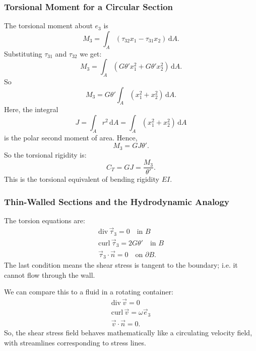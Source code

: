 \subsubsection{Torsional Moment for a Circular Section}
The torsional moment about $e_3$ is
\begin{equation*}
  M_3 = \int_A \left( \tau_{32}x_1 - \tau_{31}x_2 \right) \, \mathrm{d}A
.\end{equation*}
Substituting $\tau_{31}$ and $\tau_{32}$ we get:
\begin{equation*}
  M_3 = \int_A \left( G \theta' x_1^2 + G \theta' x_2^2\right) \, \mathrm{d}A
.\end{equation*}
So
\begin{equation*}
  M_3 = G \theta' \int_A \left( x_1^2 + x_2^2 \right)\, \mathrm{d}A
.\end{equation*}
Here, the integral
\begin{equation*}
  J = \int_A r^2 \, \mathrm{d}A = \int_A \left( x_1^2 + x_2^2 \right) \, \mathrm{d}A
\end{equation*}
is the polar second moment of area.
Hence,
\begin{equation*}
  M_3 = GJ\theta'
.\end{equation*}
So the torsional rigidity is:
\begin{equation*}
  C_T = GJ = \frac{M_3}{\theta'}
.\end{equation*}
This is the torsional equivalent of bending rigidity $EI$.

\subsubsection{Thin-Walled Sections and the Hydrodynamic Analogy}
The torsion equations are:
\begin{gather*}
  \mathrm{div}\, \Vec{\tau}_3 = 0 \quad \text{in }B \\
  \mathrm{curl} \,  \Vec{\tau}_3 = 2 G \theta' \quad \text{in } B \\
  \Vec{\tau}_3 \cdot \Vec{n} = 0 \quad \text{on } \partial B
.\end{gather*}
The last condition means the shear stress is tangent to the boundary; i.e. it cannot flow through the wall.

We can compare this to a fluid in a rotating container:
\begin{gather*}
  \mathrm{div}\,  \Vec{v} = 0 \\
  \mathrm{curl} \, \Vec{v} = \omega \Vec{e}_3 \\
  \Vec{v} \cdot \Vec{n} = 0
.\end{gather*}
So, the shear stress field behaves mathematically like a circulating velocity field, with streamlines corresponding to stress lines.

